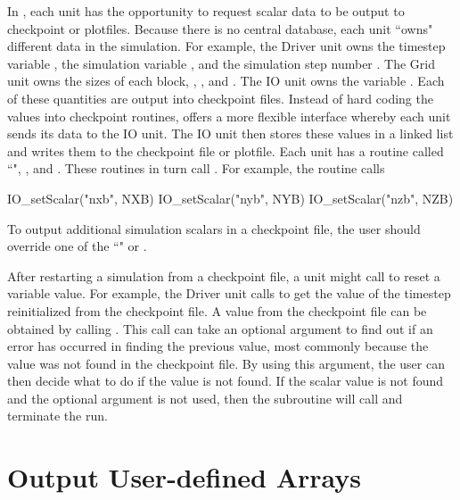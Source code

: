 In \flashx, each unit has the opportunity to request scalar data to be
output to checkpoint or plotfiles.  Because there is no central
database, each unit ``owns" different data in the
simulation. For example, the \unit{Driver} unit owns the timestep variable
, the simulation variable , and the simulation
step number .  The \unit{Grid} unit owns the sizes of each
block, , , and .  The \unit{IO} unit owns
the variable .  Each of these
quantities are output into checkpoint files. Instead of hard coding the values into
checkpoint routines, \flashx offers a more flexible interface whereby
each unit sends its data to the \unit{IO} unit.  The \unit{IO} unit then stores
these values in a linked list and writes them to the checkpoint file or
plotfile.  Each unit has a routine called ``", \eg,
 and
. These routines in turn call
.  For example, the routine
 calls

\begin{codeseg}
 IO_setScalar("nxb", NXB)
 IO_setScalar("nyb", NYB)
 IO_setScalar("nzb", NZB)
\end{codeseg}

To output additional simulation scalars in a checkpoint file, the user should 
override one of the ``" or 
.

After restarting a simulation from a checkpoint file, a unit might
call  to reset a variable value.  For example,
the \unit{Driver} unit calls 
to get the value of the timestep  reinitialized from the
checkpoint file.  A value from the checkpoint file can be obtained by calling
.  This call can take an optional argument to find out if an
error has occurred in finding the previous value, most commonly because the value
was not found in the checkpoint file.  By using this argument, the user can then
decide what to do if the value is not found.  If the scalar value is not found 
and the optional argument is not used, then the subroutine will call  and terminate the run.



\section{Output User-defined Arrays}
\label{Sec: Output user defined arrays}


